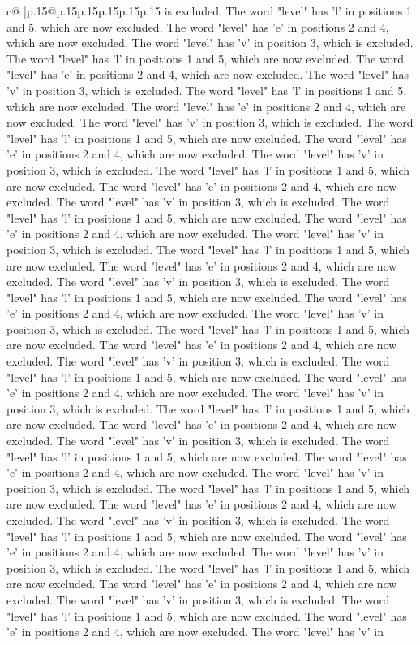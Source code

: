 \documentclass{article}
\begin{document}
{\begin{supertabular}{c@{$\;$}|p{.15\linewidth}@{}p{.15\linewidth}p{.15\linewidth}p{.15\linewidth}p{.15\linewidth}p{.15\linewidth}}
{{{is excluded. The word "level" has 'l' in positions 1 and 5, which are now excluded. The word "level" has 'e' in positions 2 and 4, which are now excluded. The word "level" has 'v' in position 3, which is excluded. The word "level" has 'l' in positions 1 and 5, which are now excluded. The word "level" has 'e' in positions 2 and 4, which are now excluded. The word "level" has 'v' in position 3, which is excluded. The word "level" has 'l' in positions 1 and 5, which are now excluded. The word "level" has 'e' in positions 2 and 4, which are now excluded. The word "level" has 'v' in position 3, which is excluded. The word "level" has 'l' in positions 1 and 5, which are now excluded. The word "level" has 'e' in positions 2 and 4, which are now excluded. The word "level" has 'v' in position 3, which is excluded. The word "level" has 'l' in positions 1 and 5, which are now excluded. The word "level" has 'e' in positions 2 and 4, which are now excluded. The word "level" has 'v' in position 3, which is excluded. The word "level" has 'l' in positions 1 and 5, which are now excluded. The word "level" has 'e' in positions 2 and 4, which are now excluded. The word "level" has 'v' in position 3, which is excluded. The word "level" has 'l' in positions 1 and 5, which are now excluded. The word "level" has 'e' in positions 2 and 4, which are now excluded. The word "level" has 'v' in position 3, which is excluded. The word "level" has 'l' in positions 1 and 5, which are now excluded. The word "level" has 'e' in positions 2 and 4, which are now excluded. The word "level" has 'v' in position 3, which is excluded. The word "level" has 'l' in positions 1 and 5, which are now excluded. The word "level" has 'e' in positions 2 and 4, which are now excluded. The word "level" has 'v' in position 3, which is excluded. The word "level" has 'l' in positions 1 and 5, which are now excluded. The word "level" has 'e' in positions 2 and 4, which are now excluded. The word "level" has 'v' in position 3, which is excluded. The word "level" has 'l' in positions 1 and 5, which are now excluded. The word "level" has 'e' in positions 2 and 4, which are now excluded. The word "level" has 'v' in position 3, which is excluded. The word "level" has 'l' in positions 1 and 5, which are now excluded. The word "level" has 'e' in positions 2 and 4, which are now excluded. The word "level" has 'v' in position 3, which is excluded. The word "level" has 'l' in positions 1 and 5, which are now excluded. The word "level" has 'e' in positions 2 and 4, which are now excluded. The word "level" has 'v' in position 3, which is excluded. The word "level" has 'l' in positions 1 and 5, which are now excluded. The word "level" has 'e' in positions 2 and 4, which are now excluded. The word "level" has 'v' in position 3, which is excluded. The word "level" has 'l' in positions 1 and 5, which are now excluded. The word "level" has 'e' in positions 2 and 4, which are now excluded. The word "level" has 'v' in position 3, which is excluded. The word "level" has 'l' in positions 1 and 5, which are now excluded. The word "level" has 'e' in positions 2 and 4, which are now excluded. The word "level" has 'v' in }}}
\end{supertabular}}
\end{document}
